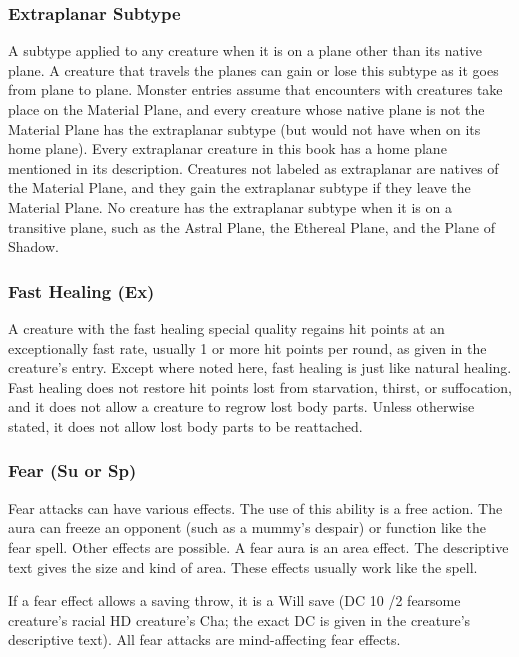 {\subsubsection{Extraplanar Subtype} A subtype applied to any creature when it is on a plane other than its native plane. A creature that travels the planes can gain or lose this subtype as it goes from plane to plane. Monster entries assume that encounters with creatures take place on the Material Plane, and every creature whose native plane is not the Material Plane has the extraplanar subtype (but would not have when on its home plane). Every extraplanar creature in this book has a home plane mentioned in its description. Creatures not labeled as extraplanar are natives of the Material Plane, and they gain the extraplanar subtype if they leave the Material Plane. No creature has the extraplanar subtype when it is on a transitive plane, such as the Astral Plane, the Ethereal Plane, and the Plane of Shadow.

\subsubsection{Fast Healing (Ex)} A creature with the fast healing special quality regains hit points at an exceptionally fast rate, usually 1 or more hit points per round, as given in the creature's entry. Except where noted here, fast healing is just like natural healing. Fast healing does not restore hit points lost from starvation, thirst, or suffocation, and it does not allow a creature to regrow lost body parts. Unless otherwise stated, it does not allow lost body parts to be reattached.

\subsubsection{Fear (Su or Sp)} Fear attacks can have various effects.
 The use of this ability is a free action. The aura can freeze an opponent (such as a mummy's despair) or function like the fear spell. Other effects are possible. A fear aura is an area effect. The descriptive text gives the size and kind of area.
 These effects usually work like the  spell. 
\par If a fear effect allows a saving throw, it is a Will save (DC 10 /2 fearsome creature's racial HD \add creature's Cha; the exact DC is given in the creature's descriptive text). All fear attacks are mind-affecting fear effects.

}
